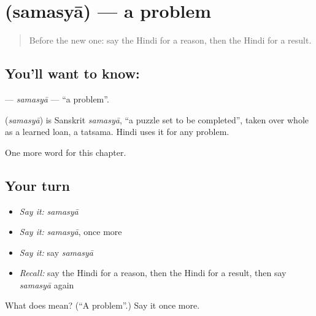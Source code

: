 \section[\texorpdfstring{\hi{समस्या} (samasyā)}{समस्या (samasyā)}]{ (samasyā) — a problem}

\label{lesson:HI-C222-samasya}



\begin{quote}
Before the new one: say the Hindi for a reason, then the Hindi for a result.
\end{quote}

\subsection*{You'll want to know: }
\textbf{} — \emph{samasyā} — \textquotedblleft{}a problem\textquotedblright{}.

\begin{cousinweb}
\textbf{} (\emph{samasyā}) is Sanskrit \emph{samasyā}, \textquotedblleft{}a puzzle set to be completed\textquotedblright{}, taken over whole as a learned loan, a tatsama. Hindi uses it for any problem.
\end{cousinweb}

\begin{grammarlens}[title={What you've built}]
One more word for this chapter.
\end{grammarlens}

\subsection*{Your turn}
\begin{itemize}
\raggedright
  \item \emph{Say it:} \emph{samasyā}
  \item \emph{Say it:} \emph{samasyā}, once more
  \item \emph{Say it:} say \emph{samasyā}
  \item \emph{Recall:} say the Hindi for a reason, then the Hindi for a result, then say \emph{samasyā} again
\end{itemize}

\begin{tcolorbox}[breakable,colback=teal!4,colframe=teal!35!black,title={Before you move on}]
What does  mean? (\textquotedblleft{}A problem\textquotedblright{}.) Say it once more.
\end{tcolorbox}
